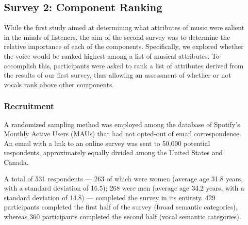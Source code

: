 \documentclass{article}
\newcommand {\aj}[1]{{\color{purple}{[AJ] {#1}}}}
\begin{document}

\subsection{Survey 2: Component Ranking}

While the first study aimed at determining what attributes of music were salient in the minds of listeners, the aim of the second survey was to determine the relative importance of each of the components. Specifically, we explored whether the voice would be ranked highest among a list of musical attributes.
To accomplish this, participants were asked to rank a list of attributes derived from the results of our first survey, thus allowing an assessment of whether or not vocals rank above other components.


\subsubsection{Recruitment}
A randomized sampling method was employed among the database of Spotify's Monthly Active Users (MAUs) that had not opted-out of email correspondence.
An email with a link to an online survey was sent to 50,000 potential respondents, approximately equally divided among the United States and Canada.

A total of 531 respondents --- 263 of which were women (average age 31.8 years, with a standard deviation of 16.5); 268 were men (average age 34.2 years, with a standard deviation of 14.8) --- completed the survey in its entirety. 429 participants completed the first half of the survey (broad semantic categories), whereas 360 participants completed the second half (vocal semantic categories).
\end{document}
